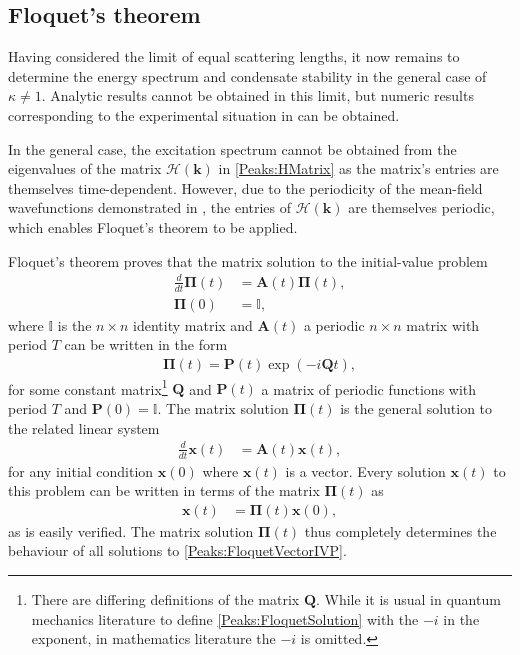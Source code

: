 \subsection[Floquet's theorem]{Floquet's theorem \citep[\S 3.2]{AppliedNonlinearDynamics}}
\label{Peaks:FloquetsTheorem}

Having considered the limit of equal scattering lengths, it now remains to determine the energy spectrum and condensate stability in the general case of $\kappa \neq 1$. Analytic results cannot be obtained in this limit, but numeric results corresponding to the experimental situation in  can be obtained.

In the general case, the excitation spectrum cannot be obtained from the eigenvalues of the matrix $\mathcal{H}(\bm{k})$ in \eqref{Peaks:HMatrix} as the matrix's entries are themselves time-dependent. However, due to the periodicity of the mean-field wavefunctions demonstrated in , the entries of $\mathcal{H}(\bm{k})$ are themselves periodic, which enables Floquet's theorem to be applied.

Floquet's theorem proves that the matrix solution to the initial-value problem
\begin{subequations}
    \label{Peaks:FloquetMatrixIVP}
    \begin{align}
        \frac{d}{dt}\bm{\Pi}(t) &= \bm{A}(t) \bm{\Pi}(t),\\
        \bm{\Pi}(0) &= \mathbb{I},
    \end{align}
\end{subequations}
where $\mathbb{I}$ is the $n \times n$ identity matrix and $\bm{A}(t)$ a periodic $n \times n$ matrix with period $T$ can be written in the form
\begin{align}
    \bm{\Pi}(t) = \bm{P}(t) \exp(-i\bm{Q} t),
    \label{Peaks:FloquetSolution}
\end{align}
for some constant matrix\footnote{There are differing definitions of the matrix $\bm{Q}$. While it is usual in quantum mechanics literature \citep{Shirley:1965,Hanggi:1998,Garrison:1999} to define \eqref{Peaks:FloquetSolution} with the $-i$ in the exponent,  in mathematics literature \citep{Moulton:1958,AppliedNonlinearDynamics} the $-i$ is omitted.} $\bm{Q}$ and $\bm{P}(t)$ a matrix of periodic functions with period $T$ and $\bm{P}(0) = \mathbb{I}$. The matrix solution $\bm{\Pi}(t)$ is the general solution to the related linear system
\begin{align}
    \frac{d}{dt}\bm{x}(t) &= \bm{A}(t) \bm{x}(t),
    \label{Peaks:FloquetVectorIVP}
\end{align}
for any initial condition $\bm{x}(0)$ where $\bm{x}(t)$ is a vector. Every solution $\bm{x}(t)$ to this problem can be written in terms of the matrix $\bm{\Pi}(t)$ as
\begin{align}
    \bm{x}(t) &= \bm{\Pi}(t) \bm{x}(0),
\end{align}
as is easily verified. The matrix solution $\bm{\Pi}(t)$ thus completely determines the behaviour of all solutions to \eqref{Peaks:FloquetVectorIVP}.

